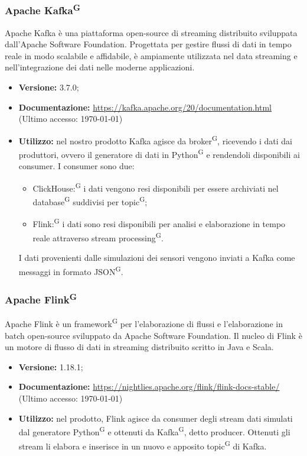\documentclass[8pt]{article}
\newcommand{\glossterm}[1]{#1\textsuperscript{G}} %
\begin{document}
\subsubsection{Apache \glossterm{Kafka}}
Apache Kafka è una piattaforma open-source di streaming distribuito sviluppata
dall’Apache Software Foundation. Progettata per gestire flussi di dati in tempo reale in modo scalabile e affidabile, è ampiamente utilizzata nel data streaming e nell’integrazione dei dati nelle moderne applicazioni.
\begin{itemize}
	\setlength\itemsep{0em}
    \item \textbf{Versione:} 3.7.0;
    \item \textbf{Documentazione:} \href{https://kafka.apache.org/20/documentation.html}{\color{myblue}https://kafka.apache.org/20/documentation.html} (Ultimo accesso: \today)
    \item \textbf{Utilizzo:} nel nostro prodotto Kafka agisce da \glossterm{broker}, ricevendo i dati dai produttori, ovvero il generatore di dati in \glossterm{Python} e rendendoli disponibili ai consumer. I consumer sono due:
    \begin{itemize}
	\setlength\itemsep{0em}
        \item \glossterm{ClickHouse:} i dati vengono resi disponibili per essere archiviati nel \glossterm{database} suddivisi per \glossterm{topic};
        \item \glossterm{Flink:} i dati sono resi disponibili per analisi e elaborazione in tempo reale attraverso \glossterm{stream processing}.
    \end{itemize}
    I dati provenienti dalle simulazioni dei sensori vengono inviati a Kafka come messaggi in formato \glossterm{JSON}.
\end{itemize}
\subsubsection{Apache \glossterm{Flink}}
Apache Flink è un \glossterm{framework} per l'elaborazione di flussi e l'elaborazione in batch open-source sviluppato da Apache Software Foundation. Il nucleo di Flink è un motore di flusso di dati in streaming distribuito scritto in Java e Scala.
\begin{itemize}
	\setlength\itemsep{0em}
    \item \textbf{Versione:} 1.18.1;
    \item \textbf{Documentazione:} \href{https://nightlies.apache.org/flink/flink-docs-stable/}{\color{myblue}https://nightlies.apache.org/flink/flink-docs-stable/} (Ultimo accesso: \today)
    \item \textbf{Utilizzo:} nel prodotto, Flink agisce da consumer degli stream dati simulati dal generatore \glossterm{Python} e ottenuti da \glossterm{Kafka}, detto producer. Ottenuti gli stream li elabora e inserisce in un nuovo e apposito \glossterm{topic} di Kafka.
    \end{itemize}
\end{document}
